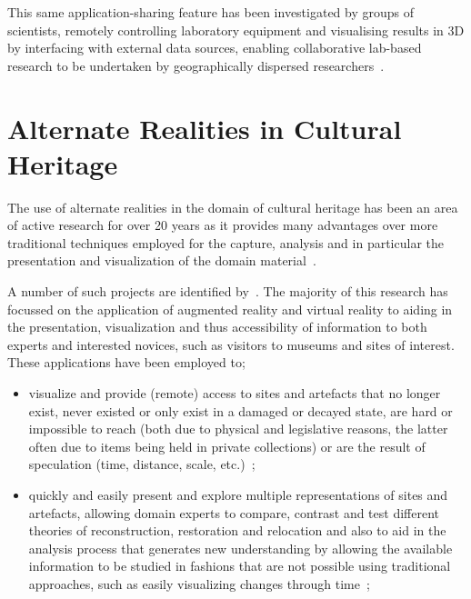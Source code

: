 \documentclass{sig-alternate}
\begin{document}
{	This same application-sharing feature has been investigated by groups of scientists, remotely controlling laboratory equipment and visualising results in 3D by interfacing with external data sources, enabling collaborative lab-based research to be undertaken by geographically dispersed researchers~\cite{Fayolle2011}.

\section{Alternate Realities in Cultural Heritage}
\label{sec:alternaterealityincultheritage}
The use of alternate realities in the domain of cultural heritage has been an area of active research for over 20 years as it provides many advantages over more traditional techniques employed for the capture, analysis and in particular the presentation and visualization of the domain material~\cite{Roussou2002}.

A number of such projects are identified by~\cite{walczak:applications}. The majority of this research has focussed on the application of augmented reality and virtual reality to aiding in the presentation, visualization and thus accessibility of information to both experts and interested novices, such as visitors to museums and sites of interest. These applications have been employed to;

\begin{itemize}
	\item visualize and provide (remote) access to sites and artefacts that no longer exist, never existed or only exist in a damaged or decayed state, are hard or impossible to reach (both due to physical and legislative reasons, the latter often due to items being held in private collections) or are the result of speculation (time, distance, scale, etc.)~\cite{griffin:recovering, deamicis:gamebased, Christou2006, Laycock2008, Dikaiakou2003, willmott:largecomplex, roussou:photorealism, Levoy1999, levoy:digitalmichelangelolong};
	
	\item quickly and easily present and explore multiple representations of sites and artefacts, allowing domain experts to compare, contrast and test different theories of reconstruction, restoration and relocation and also to aid in the analysis process that generates new understanding by allowing the available information to be studied in fashions that are not possible using traditional approaches, such as easily visualizing changes through time~\cite{Ikeuchi2003, cabral:x3dexperience, griffin:recovering, Laycock2008, Sundstedt2004, mcnamara:lightness, Levoy1999, levoy:digitalmichelangelolong};
	

\end{itemize}}
\end{document}

